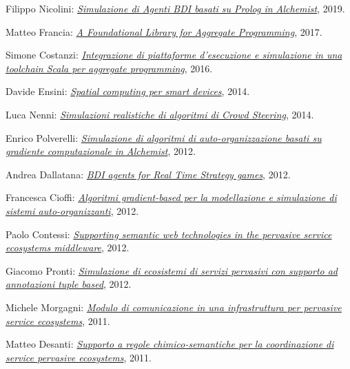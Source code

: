 \begin{innerlist}
    \item Filippo Nicolini: \href{http://amslaurea.unibo.it/19521/}{\textit{Simulazione di Agenti BDI basati su Prolog in Alchemist}}, 2019.
    \item Matteo Francia: \href{http://amslaurea.unibo.it/13090/}{\textit{A Foundational Library for Aggregate Programming}}, 2017.
    \item Simone Costanzi: \href{http://amslaurea.unibo.it/10519/}{\textit{Integrazione di piattaforme d'esecuzione e simulazione in una toolchain Scala per aggregate programming}}, 2016.
    \item Davide Ensini: \href{http://amslaurea.unibo.it/7990/}{\textit{Spatial computing per smart devices}}, 2014.
    \item Luca Nenni: \href{http://amslaurea.unibo.it/6927/}{\textit{Simulazioni realistiche di algoritmi di Crowd Steering}}, 2014.
    \item Enrico Polverelli: \href{http://amslaurea.unibo.it/5293/}{\textit{Simulazione di algoritmi di auto-organizzazione basati su gradiente computazionale in Alchemist}}, 2012.
    \item Andrea Dallatana: \href{http://amslaurea.unibo.it/4217/}{\textit{BDI agents for Real Time Strategy games}}, 2012.
    \item Francesca Cioffi: \href{http://amslaurea.unibo.it/4088/}{\textit{Algoritmi gradient-based per la modellazione e simulazione di sistemi auto-organizzanti}}, 2012.
    \item Paolo Contessi: \href{http://amslaurea.unibo.it/4074/}{\textit{Supporting semantic web technologies in the pervasive service ecosystems middleware}}, 2012.
    \item Giacomo Pronti: \href{http://archive.fo/nBeOg}{\textit{Simulazione di ecosistemi di servizi pervasivi con supporto ad annotazioni tuple based}}, 2012.
    \item Michele Morgagni: \href{http://archive.fo/6mnSN}{\textit{Modulo di comunicazione in una infrastruttura per pervasive service ecosystems}}, 2011.
    \item Matteo Desanti: \href{http://archive.fo/rwla1}{\textit{Supporto a regole chimico-semantiche per la coordinazione di service pervasive ecosystems}}, 2011.
\end{innerlist}

